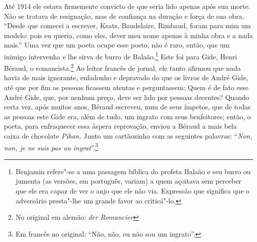 Até 1914 ele estava firmemente convicto de que seria lido apenas após
sua morte. Não se tratava de resignação, mas de confiança na duração e
força de sua obra. ``Desde que comecei a escrever, Keats, Baudelaire,
Rimbaud, foram para mim um modelo: pois eu queria, como eles, dever meu
nome apenas à minha obra e a nada mais.'' Uma vez que um poeta ocupe
esse posto, não é raro, então, que um inimigo intervenha e lhe sirva de
burro de Balaão.\footnote{Benjamin refere"-se a uma passagem bíblica do profeta Balaão e seu burro ou jumenta (as versões, em português, variam) a quem açoitava sem perceber que ele era capaz de ver o anjo que ele não via. Expressão que significa que o adversário
  presta"-lhe um grande favor ao criticá"-lo. \versal{[N.~T.]}} Este foi para Gide, Henri Béraud, o romancista.\footnote{No original em alemão: \emph{der Romancier} \versal{[N.~T.]}} Ao leitor francês de jornal, ele tanto afirmou que nada
havia de mais ignorante, enfadonho e depravado do que os livros de André
Gide, até que por fim as pessoas ficassem atentas e perguntassem: Quem é
de fato esse André Gide, que, por nenhum preço, deve ser lido por
pessoas decentes? Quando certa vez, após muitos anos, Béraud escreveu,
num de seus ímpetos, que de todas as pessoas este Gide era, além de
tudo, um ingrato com seus benfeitores; então, o poeta, para enfraquecer
essa áspera reprovação, enviou a Béraud a mais bela caixa de chocolate
\emph{Pihan.} Junto um cartãozinho com as seguintes palavras:
``\emph{Non, non, je ne suis pas un ingrat}''.\footnote{Em francês no original: ``Não,
  não, eu não sou um ingrato''. \versal{[N.~T.]}}

